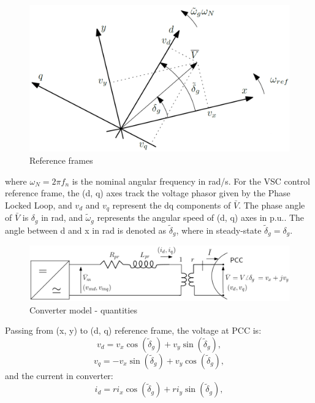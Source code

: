 \documentclass{report}
\begin{document}
\begin{figure}[H]
    \centering
    \includegraphics[scale = 0.24]{Figure_converter/reference_frame.png}
    \caption{Reference frames}
    \label{fig:reference_frames}
\end{figure}
where $\omega_N = 2\pi f_n$ is the nominal angular frequency in rad/s. For the VSC control reference frame, the (d, q) axes track the voltage phasor given by the Phase Locked Loop, and $v_d$ and $v_q$ represent the dq components of  $\bar{V}$. The phase angle of $\bar{V}$ is $\delta_g$ in rad, and $\tilde{\omega}_g$ represents the angular speed of (d, q) axes in p.u.. The angle between d and x in rad is denoted as $\tilde{\delta}_g$, where in steady-state $\tilde{\delta}_g = \delta_g$.
\begin{figure}[H]
    \centering
    \includegraphics[scale = 0.35]{Figure_converter/converter_model_2.png}
    \caption{Converter model - quantities}
    \label{fig:converter_model_2}
\end{figure}
Passing from (x, y) to (d, q) reference frame, the voltage at PCC is:
\begin{equation}
    v_d = v_x\cos(\tilde{\delta}_g) + v_y\sin(\tilde{\delta}_g),
\end{equation}
\begin{equation}
    v_q = -v_x\sin(\tilde{\delta}_g) + v_y\cos(\tilde{\delta}_g),
\end{equation}
and the current in converter:
\begin{equation}
    i_d = ri_x\cos(\tilde{\delta}_g) + ri_y\sin(\tilde{\delta}_g),
\end{equation}
\end{document}

